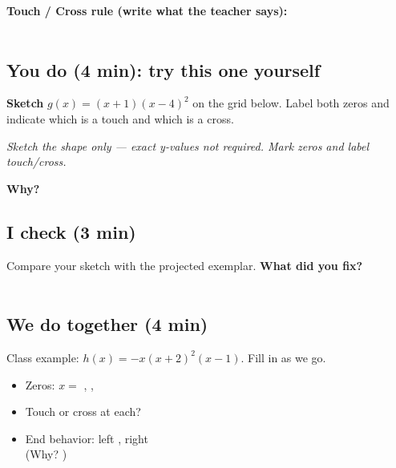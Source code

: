 \documentclass[11pt]{article}
\newcommand{\framedline}[1]{\underline{\hspace{#1}}}
\newcommand{\frameblank}{\underline{\hspace{4em}}}
\begin{document}
\vspace{0.3em}
\textbf{Touch / Cross rule (write what the teacher says):} \\
\framedline{6in} \\[6pt]
\framedline{6in}

\begin{samepage}
\subsection*{You do (4 min): try this one yourself}

\textbf{Sketch} $g(x) = (x+1)(x-4)^2$ on the grid below. Label both zeros and indicate which is a touch and which is a cross.

\begin{center}
\end{center}
{\small\textit{Sketch the shape only --- exact y-values not required. Mark zeros and label touch/cross.}}

\textbf{Why?} \framedline{5.5in} \\[6pt]
\framedline{6in}
\end{samepage}

\subsection*{I check (3 min)}

Compare your sketch with the projected exemplar. \textbf{What did you fix?} \\
\framedline{5in} \\[6pt]
\framedline{5in}

\subsection*{We do together (4 min)}

Class example: $h(x) = -x(x+2)^2(x-1)$. Fill in as we go.

\begin{itemize}[leftmargin=*, nosep]
    \item Zeros: $x = $ \frameblank, \frameblank, \frameblank
    \item Touch or cross at each? \framedline{5in}
    \item End behavior: left \frameblank, right \frameblank \\
          \hspace*{1em}(Why? \framedline{4.5in})
\end{itemize}
\end{document}
